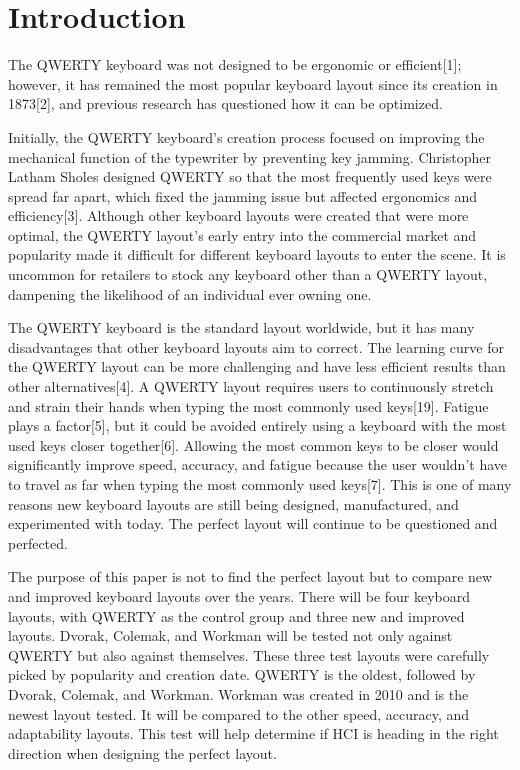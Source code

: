 \documentclass[manuscript,screen,review]{acmart}
\begin{document}
\section{Introduction}
    The QWERTY keyboard was not designed to be ergonomic or efficient[1]; however, it has remained the most popular keyboard layout since its creation in 1873[2], and previous research has questioned how it can be optimized.
    
        Initially, the QWERTY keyboard's creation process focused on improving the mechanical function of the typewriter by preventing key jamming. Christopher Latham Sholes designed QWERTY so that the most frequently used keys were spread far apart, which fixed the jamming issue but affected ergonomics and efficiency[3]. Although other keyboard layouts were created that were more optimal, the QWERTY layout's early entry into the commercial market and popularity made it difficult for different keyboard layouts to enter the scene. It is uncommon for retailers to stock any keyboard other than a QWERTY layout, dampening the likelihood of an individual ever owning one.
        
        The QWERTY keyboard is the standard layout worldwide, but it has many disadvantages that other keyboard layouts aim to correct. The learning curve for the QWERTY layout can be more challenging and have less efficient results than other alternatives[4]. A QWERTY layout requires users to continuously stretch and strain their hands when typing the most commonly used keys[19]. Fatigue plays a factor[5], but it could be avoided entirely using a keyboard with the most used keys closer together[6]. Allowing the most common keys to be closer would significantly improve speed, accuracy, and fatigue because the user wouldn't have to travel as far when typing the most commonly used keys[7]. This is one of many reasons new keyboard layouts are still being designed, manufactured, and experimented with today. The perfect layout will continue to be questioned and perfected.

        The purpose of this paper is not to find the perfect layout but to compare new and improved keyboard layouts over the years. There will be four keyboard layouts, with QWERTY as the control group and three new and improved layouts. Dvorak, Colemak, and Workman will be tested not only against QWERTY but also against themselves. These three test layouts were carefully picked by popularity and creation date. QWERTY is the oldest, followed by Dvorak, Colemak, and Workman. Workman was created in 2010 and is the newest layout tested. It will be compared to the other speed, accuracy, and adaptability layouts. This test will help determine if HCI is heading in the right direction when designing the perfect layout.  
        
\end{document}
